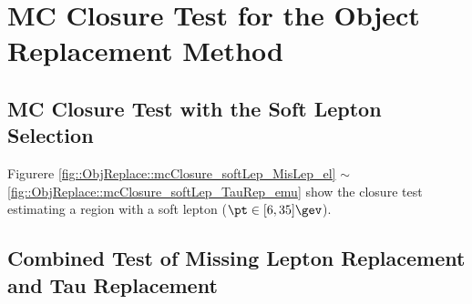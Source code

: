 \section{MC Closure Test for the Object Replacement Method} \label{sec::App::objRep_closure}
\subsection{MC Closure Test with the Soft Lepton Selection} \label{sec::App::objRep_closure_softLep}
Figurere \ref{fig::ObjReplace::mcClosure_softLep_MisLep_el} $\sim$ \ref{fig::ObjReplace::mcClosure_softLep_TauRep_emu} show the closure test estimating a region with a soft lepton ($\pt\in[6,35]\gev$).





\clearpage
\subsection{Combined Test of Missing Lepton Replacement and Tau Replacement}


